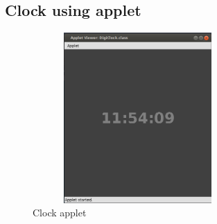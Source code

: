 \documentclass[a4paper,16pt]{article}
\begin{document}
	\subsection{Clock using applet}
	
	\begin{figure}[h!]
		\centering
		\includegraphics[width=8cm,height=6.5cm]{code/Clock/clock.png}
		\caption{Clock applet}
	\end{figure}
	\newpage
\end{document}
